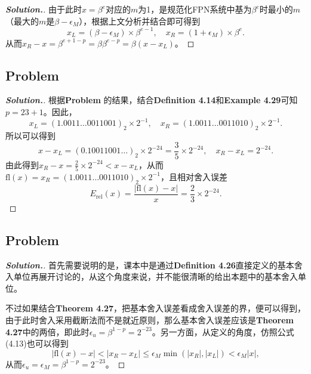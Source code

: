 \documentclass{ctexart}
\begin{document}
\begin{sloppypar}
\begin{proof}[\textbf{Solution.}]
由于此时$x=\beta^e$对应的$m$为1，是规范化FPN系统中基为$\beta^e$时最小的$m$（最大的$m$是$\beta-\epsilon_M$），根据上文分析并结合即可得到
\begin{equation}
    x_L =(\beta-\epsilon_M ) \times \beta^{e-1}, \quad  x_R =(1+\epsilon_M ) \times \beta^{e}.
\end{equation}
从而$x_R-x = \beta^{e+1-p} = \beta\beta^{e-p} = \beta(x-x_L)$。
\end{proof}

\subsection*{Problem \uppercase\expandafter{}}
\begin{proof}[\textbf{Solution.}]
根据\textbf{Problem \uppercase\expandafter{}}的结果，结合\textbf{Definition 4.14}和\textbf{Example 4.29}可知$p=23+1$。因此，
\begin{equation}
    x_L =(1.0011\dots0011001)_2 \times 2^{-1}, \quad  x_R =(1.0011\dots0011010)_2 \times 2^{-1}.
\end{equation}
所以可以得到
\begin{equation}
    x-x_L = (0.10011001\dots)_2 \times 2^{-24} = \frac{3}{5}\times 2^{-24}
, \quad  x_R-x_L = 2^{-24}.
\end{equation}
由此得到$x_R-x = \frac{2}{5}\times 2^{-24} < x-x_L$，从而$\mathrm{fl}(x) = x_R=(1.0011\dots0011010)_2 \times 2^{-1}$，且相对舍入误差
\begin{equation}
    E_{\mathrm{rel}}(x) = \frac{|\mathrm{fl}(x)-x|}{x} =  \frac{2}{3}\times 2^{-24}.
\end{equation}
\end{proof}

\subsection*{Problem \uppercase\expandafter{}}
\begin{proof}[\textbf{Solution.}]
首先需要说明的是，课本中是通过\textbf{Definition 4.26}直接定义的基本舍入单位再展开讨论的，从这个角度来说，并不能很清晰的给出本题中的基本舍入单位。

不过如果结合\textbf{Theorem 4.27}，把基本舍入误差看成舍入误差的界，便可以得到，由于此时舍入采用截断法而不是就近原则，那么基本舍入误差应该是\textbf{Theorem 4.27}中的两倍，即此时$\epsilon_u = \beta^{1-p} = 2^{-23}$。另一方面，从定义的角度，仿照公式(4.13)也可以得到
\begin{equation}
    |\mathrm{fl}(x)-x| < |x_R-x_L| \leq \epsilon_M \min(|x_R|,|x_L|)<\epsilon_M |x|,
\end{equation}
从而$\epsilon_u =\epsilon_M= \beta^{1-p}=2^{-23}$。
\end{proof}


\end{sloppypar}
\end{document}
